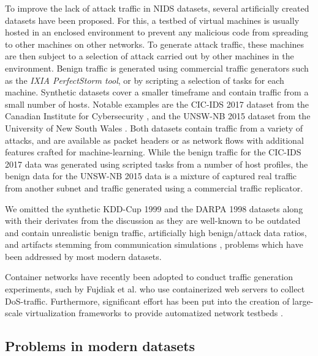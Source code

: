 To improve the lack of attack traffic in NIDS datasets, several artificially created datasets have been proposed. For this, a testbed of virtual machines is usually hosted in an enclosed environment to prevent any malicious code from spreading to other machines on other networks. To generate attack traffic, these machines are then subject to a selection of attack carried out by other machines in the environment. Benign traffic is generated using commercial traffic generators such as the \emph{IXIA PerfectStorm tool}, or by scripting a selection of tasks for each machine. Synthetic datasets cover a smaller timeframe and contain traffic from a small number of hosts. Notable examples are the CIC-IDS 2017 dataset from the Canadian Institute for Cybersecurity \cite{sharafaldin2018towards}, %
and the UNSW-NB 2015 dataset from the University of New South Wales \cite{moustafa_unsw-nb15:_2015}. Both datasets contain traffic from a variety of attacks, and are available as packet headers or as network flows with additional features crafted for machine-learning. While the benign traffic for the CIC-IDS 2017 data was generated using scripted tasks from a number of host profiles, the benign data for the UNSW-NB 2015 data is a mixture of captured real traffic from another subnet and traffic generated using a commercial traffic replicator. 


We omitted the synthetic KDD-Cup 1999 and the DARPA 1998 datasets along with their derivates from the discussion as they are well-known to be outdated and contain unrealistic benign traffic, artificially high benign/attack data ratios, and artifacts stemming from communication simulations \cite{tavallaee2009detailed,mchugh2000testing}, problems which have been addressed by most modern datasets.

Container networks have recently been adopted to conduct traffic generation experiments, such by Fujdiak et al. \cite{fujdiak2018ip} who use containerized web servers to collect DoS-traffic. Furthermore, significant effort has been put into the creation of large-scale virtualization frameworks to provide automatized network testbeds \cite{crussell2015minimega, badiger2018violet}.




\subsection{Problems in modern datasets}\label{Sec:problems}

